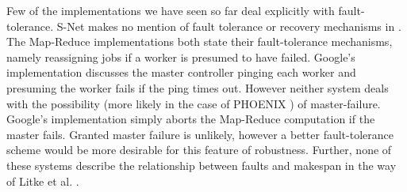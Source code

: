Few of the implementations we have seen so far deal explicitly with fault-tolerance.
S-Net makes no mention of fault tolerance or recovery mechanisms in \cite{pen09}.
The Map-Reduce implementations \cite{dea08, ran07} both state their fault-tolerance mechanisms, namely reassigning jobs if a worker is presumed to have failed.
Google's implementation discusses the master controller pinging each worker and presuming the worker fails if the ping times out.
However neither system deals with the possibility (more likely in the case of PHOENIX \cite{ran07}) of master-failure.
Google's implementation simply aborts the Map-Reduce computation if the master fails.
Granted master failure is unlikely, however a better fault-tolerance scheme would be more desirable for this feature of robustness.
Further, none of these systems describe the relationship between faults and makespan in the way of Litke et al. \cite{lit07}.